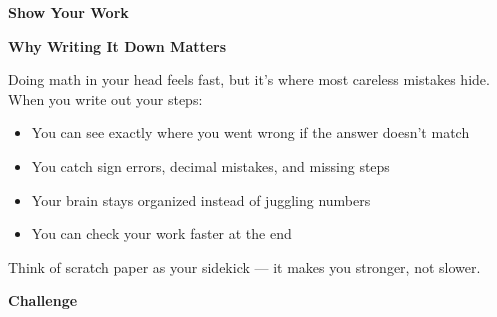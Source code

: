 \clearpage
\thispagestyle{empty}
{\sffamily

\begin{center}
{\fontsize{22}{26}\selectfont\bfseries\color{funTeal} \faPencilRuler\hspace{3mm}Show Your Work\hspace{3mm}\faPencilRuler}

\vspace{2mm}
{\color{funGray}\hrulefill}
\end{center}

\vspace{3mm}

\begin{tcolorbox}[
    enhanced,
    colback=funTealLight,
    colframe=funTeal!50,
    arc=10pt,
    boxrule=1.5pt,
    left=6mm, right=6mm, top=5mm, bottom=5mm,
]
{\large\bfseries\color{funTealDark} \faFileAlt\hspace{2mm}Why Writing It Down Matters}

\vspace{2mm}

Doing math in your head feels fast, but it's where most careless mistakes hide. When you write out your steps:

\vspace{3mm}

\begin{itemize}[leftmargin=6mm, itemsep=3pt]
    \item[\textcolor{funTeal}{\faCheck}] You can see exactly where you went wrong if the answer doesn't match
    \item[\textcolor{funTeal}{\faCheck}] You catch sign errors, decimal mistakes, and missing steps
    \item[\textcolor{funTeal}{\faCheck}] Your brain stays organized instead of juggling numbers
    \item[\textcolor{funTeal}{\faCheck}] You can check your work faster at the end
\end{itemize}

\vspace{2mm}

Think of scratch paper as your sidekick — it makes you stronger, not slower.
\end{tcolorbox}

\vspace{3mm}

\begin{tcolorbox}[
    enhanced,
    colback=funYellowLight,
    colframe=funYellow!60,
    arc=10pt,
    boxrule=1pt,
    left=6mm, right=6mm, top=4mm, bottom=4mm,
]
{\bfseries\color{funYellowDark} \faLightbulb\hspace{2mm}Challenge}


\end{tcolorbox}}

